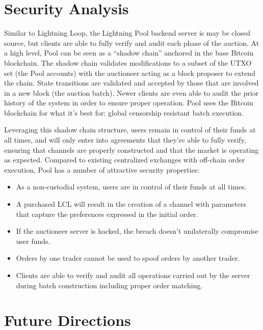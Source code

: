 \documentclass[10pt,a4paper]{article}
\theoremstyle{definition}
\begin{document}
\section{Security Analysis}

Similar to Lightning Loop, the Lightning Pool backend server is may be closed
source, but clients are able to fully verify and audit each phase of the
auction. At a high level, Pool can be seen as a “shadow chain” anchored in the
base Bitcoin blockchain. The shadow chain validates modifications to a subset
of the UTXO set (the Pool accounts) with the auctioneer acting as a block
proposer to extend the chain. State transitions are validated and accepted by
those that are involved in a new block (the auction batch). Newer clients are
even able to audit the prior history of the system in order to ensure proper
operation. Pool uses the Bitcoin blockchain for what it’s best for: global
censorship resistant batch execution.

Leveraging this shadow chain structure, users remain in control of their funds
at all times, and will only enter into agreements that they’re able to fully
verify, ensuring that channels are properly constructed and that the market is
operating as expected. Compared to existing centralized exchanges with
off-chain order execution, Pool has a number of attractive security properties:
\begin{itemize}

    \item As a non-custodial system, users are in control of their funds at all
        times.

    \item A purchased LCL will result in the creation of a channel with parameters
        that capture the preferences expressed in the initial order.

    \item If the auctioneer server is hacked, the breach doesn’t unilaterally
        compromise user funds.

    \item Orders by one trader cannot be used to spoof orders by another trader.

    \item Clients are able to verify and audit all operations carried out by the
        server during batch construction including proper order matching.

\end{itemize}


\section{Future Directions}
\end{document}
